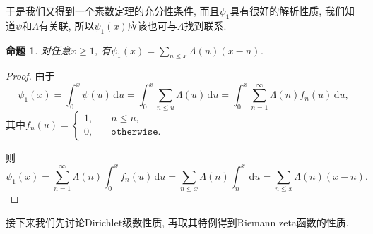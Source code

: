 \documentclass[12pt, a4paper, oneside]{ctexart}
\newtheorem{proposition}{命题}[section]
\numberwithin{equation}{section}  %
\let\leq=\leqslant %
\let\geq=\geqslant %
\def\d{\mathrm{d}}          %
\begin{document}
于是我们又得到一个素数定理的充分性条件, 而且$\psi_1$具有很好的解析性质, 我们知道$\psi$和$\Lambda$有关联, 所以$\psi_1(x)$应该也可与$\Lambda$找到联系.
\begin{proposition}\label{prop-psi-lambda}
    对任意$x \geq 1$, 有$\psi_1(x)=\sum_{n\leq x}\Lambda(n)(x-n)$.
\end{proposition}
\begin{proof}
    由于
    \begin{equation*}
        \psi_1(x) = \int_0^x\psi(u)\,\d u = \int_0^x\sum_{n\leq u}\Lambda(u)\,\d u = \int_0^x\sum_{n=1}^\infty \Lambda(n)f_n(u)\,\d u,
    \end{equation*}
    其中$f_n(u) = \begin{cases}
        1,&\quad n\leq u,\\
        0,&\quad \mathtt{otherwise}.
    \end{cases}$

    则
    \begin{equation*}
        \psi_1(x) = \sum_{n=1}^\infty\Lambda(n)\int_0^xf_n(u)\,\d u =\sum_{n\leq x}\Lambda(n)\int_n^x\,\d u= \sum_{n\leq x}\Lambda(n)(x-n).
    \end{equation*}
\end{proof}
接下来我们先讨论Dirichlet级数性质, 再取其特例得到Riemann zeta函数的性质.
\end{document}
